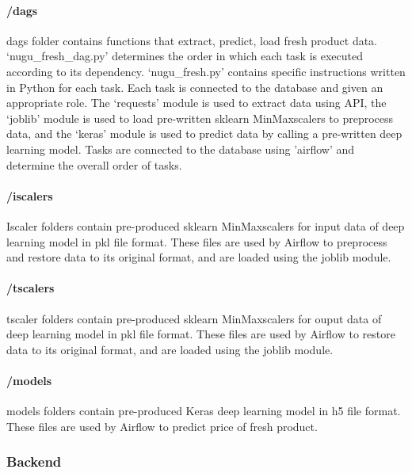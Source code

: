 \documentclass[conference]{IEEEtran}
\begin{document}
\paragraph{/dags}
dags folder contains functions that extract, predict, load fresh product data. ‘nugu\_fresh\_dag.py’ determines the order in which each task is executed according to its dependency. ‘nugu\_fresh.py’ contains specific instructions written in Python for each task. Each task is connected to the database and given an appropriate role. The ‘requests’ module is used to extract data using API, the ‘joblib’ module is used to load pre-written sklearn MinMaxscalers to preprocess data, and the ‘keras’ module is used to predict data by calling a pre-written deep learning model. Tasks are connected to the database using 'airflow' and determine the overall order of tasks.

\paragraph{/iscalers}
Iscaler folders contain pre-produced sklearn MinMaxscalers for input data of deep learning model in pkl file format. These files are used by Airflow to preprocess and restore data to its original format, and are loaded using the joblib module.

\paragraph{/tscalers}
tscaler folders contain pre-produced sklearn MinMaxscalers for ouput data of deep learning model in pkl file format. These files are used by Airflow to restore data to its original format, and are loaded using the joblib module.

\paragraph{/models}
models folders contain pre-produced Keras deep learning model in h5 file format. These files are used by Airflow to predict price of fresh product.

\subsubsection{Backend}
\end{document}
